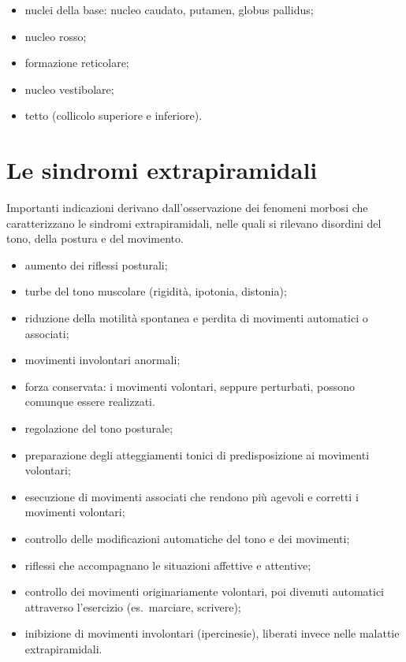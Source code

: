 \begin{itemize}
  \item nuclei della base: nucleo caudato, putamen, globus pallidus;
  \item nucleo rosso;
  \item formazione reticolare;
  \item nucleo vestibolare;
  \item tetto (collicolo superiore e inferiore).
\end{itemize}

\section{Le sindromi extrapiramidali}

Importanti indicazioni derivano dall'osservazione dei fenomeni morbosi che
caratterizzano le sindromi extrapiramidali, nelle quali si rilevano
disordini del tono, della postura e del movimento.

\begin{itemize}
  \item aumento dei riflessi posturali;
  \item turbe del tono muscolare (rigidità, ipotonia, distonia);
  \item riduzione della motilità spontanea e perdita di movimenti
    automatici o associati;
  \item movimenti involontari anormali;
  \item forza conservata: i movimenti volontari, seppure perturbati,
    possono comunque essere realizzati.
\end{itemize}

\begin{itemize}
  \item regolazione del tono posturale;
  \item preparazione degli atteggiamenti tonici di predisposizione ai
    movimenti volontari;
  \item esecuzione di movimenti associati che rendono più agevoli e
    corretti i movimenti volontari;
  \item controllo delle modificazioni automatiche del tono e dei
    movimenti;
  \item riflessi che accompagnano le situazioni affettive e attentive;
  \item controllo dei movimenti originariamente volontari, poi divenuti
    automatici attraverso l'esercizio (es.\ marciare, scrivere);
  \item inibizione di movimenti involontari (ipercinesie), liberati
    invece nelle malattie extrapiramidali.
\end{itemize}
